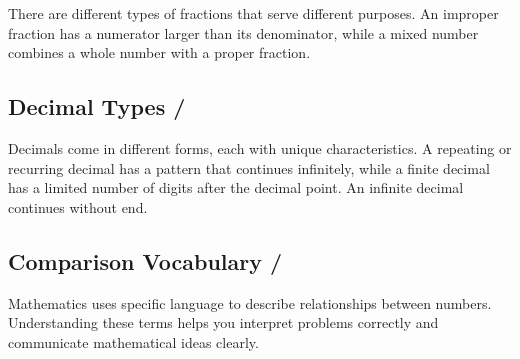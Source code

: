 There are different types of fractions that serve different purposes. An improper fraction has a numerator larger than its denominator, while a mixed number combines a whole number with a proper fraction.

\blockquote{}

\blockquote{}

\subsection{Decimal Types / }

Decimals come in different forms, each with unique characteristics. A repeating or recurring decimal has a pattern that continues infinitely, while a finite decimal has a limited number of digits after the decimal point. An infinite decimal continues without end.

\blockquote{}

\blockquote{}

\blockquote{}
\blockquote{}
 

\blockquote{}

\blockquote{}


\newpage
\subsection{Comparison Vocabulary / }

Mathematics uses specific language to describe relationships between numbers. Understanding these terms helps you interpret problems correctly and communicate mathematical ideas clearly.

